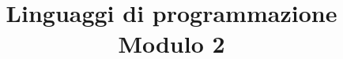 
\title{\LARGE \textbf{Linguaggi di programmazione \\ \small Modulo 2}}

\maketitle
{}
\tableofcontents










